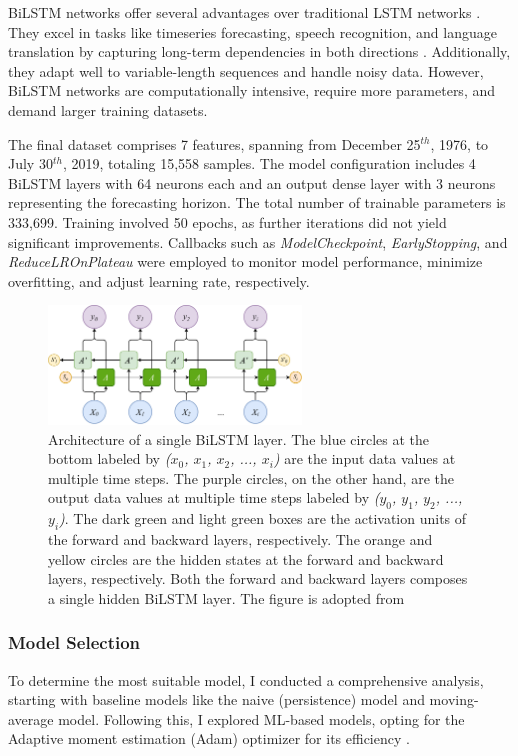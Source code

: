 BiLSTM networks offer several advantages over traditional LSTM networks \citep{graves_2005, ihianle_2020, alharbi_2021}. They excel in tasks like timeseries forecasting, speech recognition, and language translation by capturing long-term dependencies in both directions \citep{wollmer_2013, graves_2014, sundermeyer_2014, huang_2018, nammous_2022}. Additionally, they adapt well to variable-length sequences and handle noisy data. However, BiLSTM networks are computationally intensive, require more parameters, and demand larger training datasets.

The final dataset comprises 7 features, spanning from December 25$^{th}$, 1976, to July 30$^{th}$, 2019, totaling 15,558 samples. The model configuration includes 4 BiLSTM layers with 64 neurons each and an output dense layer with 3 neurons representing the forecasting horizon. The total number of trainable parameters is 333,699. Training involved 50 epochs, as further iterations did not yield significant improvements.
Callbacks such as \textit{ModelCheckpoint}, \textit{EarlyStopping}, and \textit{ReduceLROnPlateau} were employed to monitor model performance, minimize overfitting, and adjust learning rate, respectively.

\begin{figure}[!htp]
	\centering
	\includegraphics[width=0.6\textwidth]{chapter4/figs/diagram.drawio.pdf}
	\caption{Architecture of a single BiLSTM layer. The blue circles at the bottom labeled by \textit{($x_0$, $x_1$, $x_2$, ..., $x_i$)} are the input data values at multiple time steps. The purple circles, on the other hand, are the output data values at multiple time steps labeled by \textit{($y_0$, $y_1$, $y_2$, ..., $y_i$)}. The dark green and light green boxes are the activation units of the forward and backward layers, respectively. The orange and yellow circles are the hidden states at the forward and backward layers, respectively. Both the forward and backward layers composes a single hidden BiLSTM layer. The figure is adopted from \citet{olah_2015}}
	\label{fig_model}
\end{figure}

\subsubsection{Model Selection}
To determine the most suitable model, I conducted a comprehensive analysis, starting with baseline models like the naive (persistence) model and moving-average model. Following this, I explored ML-based models, opting for the Adaptive moment estimation (Adam) optimizer for its efficiency \citep{kingma_2015}.

